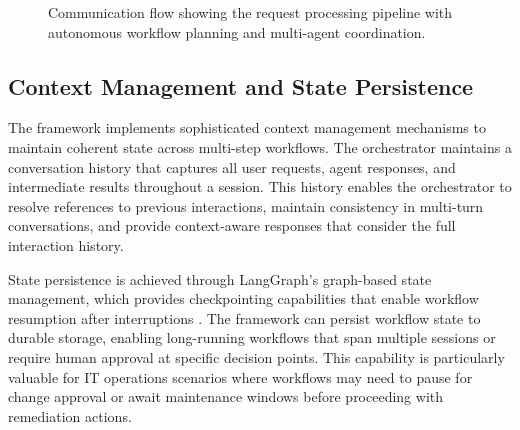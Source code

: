 \documentclass{article}
\begin{document}
\begin{figure}[htbp]
  \caption{Communication flow showing the request processing pipeline with autonomous workflow planning and multi-agent coordination.}
  \label{fig:communication-flow}
\end{figure}

\subsection{Context Management and State Persistence}

The framework implements sophisticated context management mechanisms to maintain coherent state across multi-step workflows. The orchestrator maintains a conversation history that captures all user requests, agent responses, and intermediate results throughout a session. This history enables the orchestrator to resolve references to previous interactions, maintain consistency in multi-turn conversations, and provide context-aware responses that consider the full interaction history.

State persistence is achieved through LangGraph's graph-based state management, which provides checkpointing capabilities that enable workflow resumption after interruptions \cite{langchain2024}. The framework can persist workflow state to durable storage, enabling long-running workflows that span multiple sessions or require human approval at specific decision points. This capability is particularly valuable for IT operations scenarios where workflows may need to pause for change approval or await maintenance windows before proceeding with remediation actions.
\end{document}
